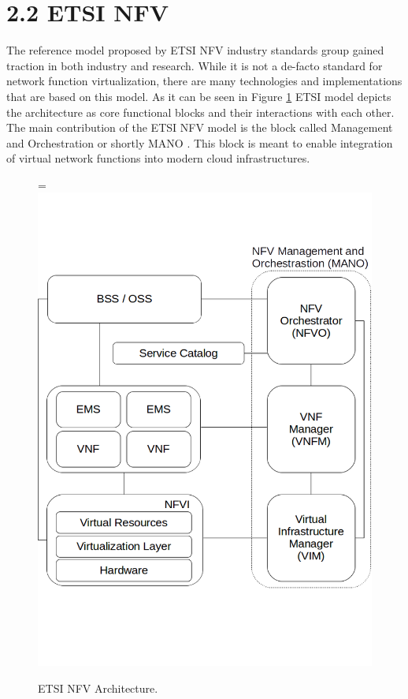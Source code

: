 \documentclass[12pt,oneandhalf,chaparabic,ceng,ms,eng,oneside,pntc]{gsufbe}
\makeatletter
\let\old@includegraphics\includegraphics
\renewcommand{\includegraphics}[2][,]{%
  \setbox9=\hbox{\old@includegraphics[#1]{#2}}%
  \ifdim\wd9>\textwidth
    \old@includegraphics[#1,width=\textwidth]{#2}%
  \else
    \old@includegraphics[#1]{#2}%
  \fi%
}
\makeatother
\begin{document}
\section[ETSI NFV]{2.2 ETSI NFV}
The reference model \cite{etsi_nfv} proposed by ETSI NFV industry standards group gained traction
in both industry and
research.  While it is not a de-facto standard for network function virtualization, there are many
technologies and implementations that are based on this model.  As it can be seen in Figure \ref{fig:mano}
ETSI model depicts the architecture as core functional blocks and their interactions with each other.  
The main contribution of the ETSI NFV model is the block called Management and Orchestration or shortly
MANO \cite{etsi_nfvman}.  This block is meant to enable integration of virtual network functions 
into modern cloud
infrastructures.

\begin{figure}
\centering
\includegraphics[]{mano.png}
\caption{ETSI NFV Architecture.}
\label{fig:mano}
\end{figure}
\end{document}
